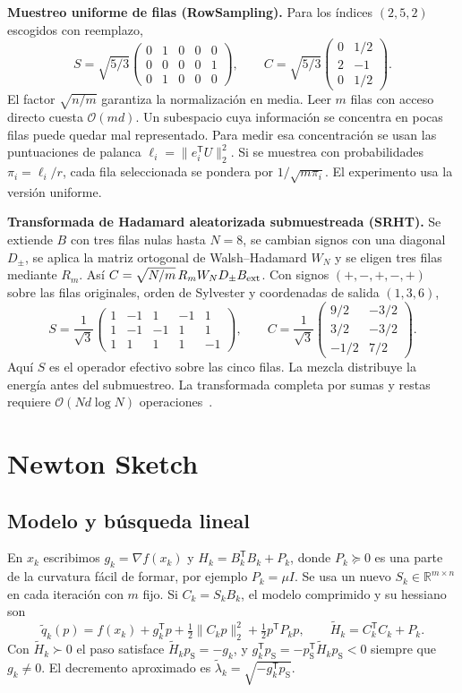 \documentclass[11pt,a4paper]{article}
\newcommand{\R}{\mathbb R}
\newcommand{\T}{^{\mathsf T}}
\newcommand{\nrm}[1]{\lVert #1\rVert}
\newcommand{\cO}{\mathcal O}
\newcommand{\pS}{p_{\mathrm S}}
\newcommand{\HS}{\widetilde H}
\newcommand{\lS}{\widetilde\lambda}
\newcommand{\tema}[1]{\smallskip\par\textbf{#1}\enspace\ignorespaces}
\begin{document}
\tema{Muestreo uniforme de filas (RowSampling).} Para los índices $(2,5,2)$ escogidos con reemplazo,
\[
 S=\sqrt{5/3}\begin{pmatrix}0&1&0&0&0\\0&0&0&0&1\\0&1&0&0&0\end{pmatrix},\qquad
 C=\sqrt{5/3}\begin{pmatrix}0&1/2\\2&-1\\0&1/2\end{pmatrix}.
\]
El factor $\sqrt{n/m}$ garantiza la normalización en media. Leer $m$ filas con acceso directo cuesta $\cO(md)$. Un subespacio cuya información se concentra en pocas filas puede quedar mal representado. Para medir esa concentración se usan las puntuaciones de palanca $\ell_i=\nrm{e_i\T U}_2^2$. Si se muestrea con probabilidades $\pi_i=\ell_i/r$, cada fila seleccionada se pondera por $1/\sqrt{m\pi_i}$. El experimento usa la versión uniforme.

\tema{Transformada de Hadamard aleatorizada submuestreada (SRHT).} Se extiende $B$ con tres filas nulas hasta $N=8$, se cambian signos con una diagonal $D_\pm$, se aplica la matriz ortogonal de Walsh--Hadamard $W_N$ y se eligen tres filas mediante $R_m$. Así $C=\sqrt{N/m}\,R_mW_ND_\pm B_{\rm ext}$. Con signos $(+,-,+,-,+)$ sobre las filas originales, orden de Sylvester y coordenadas de salida $(1,3,6)$,
\[
 S=\frac1{\sqrt3}\begin{pmatrix}1&-1&1&-1&1\\1&-1&-1&1&1\\1&1&1&1&-1\end{pmatrix},\qquad
 C=\frac1{\sqrt3}\begin{pmatrix}9/2&-3/2\\3/2&-3/2\\-1/2&7/2\end{pmatrix}.
\]
Aquí $S$ es el operador efectivo sobre las cinco filas. La mezcla distribuye la energía antes del submuestreo. La transformada completa por sumas y restas requiere $\cO(Nd\log N)$ operaciones~\cite{MT20,PW17}.

\section{Newton Sketch}\label{sec:ns}
\subsection{Modelo y búsqueda lineal}
En $x_k$ escribimos $g_k=\nabla f(x_k)$ y $H_k=B_k\T B_k+P_k$, donde $P_k\succeq0$ es una parte de la curvatura fácil de formar, por ejemplo $P_k=\mu I$. Se usa un nuevo $S_k\in\R^{m\times n}$ en cada iteración con $m$ fijo. Si $C_k=S_kB_k$, el modelo comprimido y su hessiano son
\begin{equation}
 \widetilde q_k(p)= f(x_k)+g_k\T p+\tfrac12\nrm{C_kp}_2^2+\tfrac12p\T P_kp,\qquad
 \HS_k=C_k\T C_k+P_k.\label{eq:parcial}
\end{equation}
Con $\HS_k\succ0$ el paso satisface $\HS_k\pS=-g_k$, y $g_k\T\pS=-\pS\T\HS_k\pS<0$ siempre que $g_k\ne0$. El decremento aproximado es $\lS_k=\sqrt{-g_k\T\pS}$.
\end{document}
